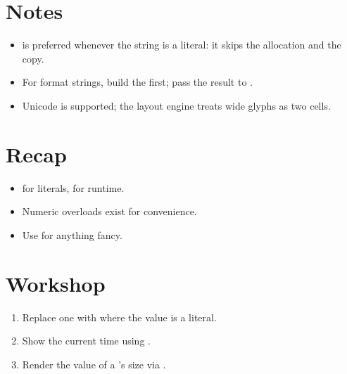\section{Notes}

\begin{itemize}[leftmargin=*]
  \item {} is preferred whenever the string is
    a literal: it skips the allocation and the copy.
  \item For format strings, build the 
    first; pass the result to .
  \item Unicode is supported; the layout engine treats wide
    glyphs as two cells.
\end{itemize}

\section{Recap}

\begin{recap}
\begin{itemize}[leftmargin=*]
  \item {} for literals,  for runtime.
  \item Numeric overloads exist for convenience.
  \item Use  for anything fancy.
\end{itemize}
\end{recap}

\section*{Workshop}

\begin{enumerate}[leftmargin=*]
  \item Replace one  with 
    where the value is a literal.
  \item Show the current time using
    .
  \item Render the value of a 's size
    via .
\end{enumerate}
